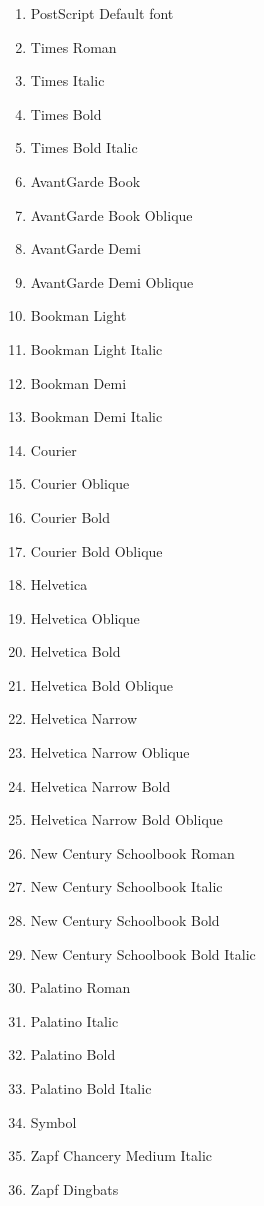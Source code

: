 \documentclass[10pt, a4paper, english]{article}%
\begin{document}
\begin{enumerate}
\item[-1] PostScript Default font
\item[0]  Times Roman
\item     Times Italic
\item     Times Bold
\item     Times Bold Italic
\item     AvantGarde Book
\item     AvantGarde Book Oblique
\item     AvantGarde Demi
\item     AvantGarde Demi Oblique
\item     Bookman Light
\item     Bookman Light Italic
\item     Bookman Demi
\item     Bookman Demi Italic
\item     Courier
\item     Courier Oblique
\item     Courier Bold
\item     Courier Bold Oblique
\item     Helvetica
\item     Helvetica Oblique
\item     Helvetica Bold
\item     Helvetica Bold Oblique
\item     Helvetica Narrow
\item     Helvetica Narrow Oblique
\item     Helvetica Narrow Bold
\item     Helvetica Narrow Bold Oblique
\item     New Century Schoolbook Roman
\item     New Century Schoolbook Italic
\item     New Century Schoolbook Bold
\item     New Century Schoolbook Bold Italic
\item     Palatino Roman
\item     Palatino Italic
\item     Palatino Bold
\item     Palatino Bold Italic
\item     Symbol
\item     Zapf Chancery Medium Italic
\item     Zapf Dingbats
\end{enumerate}
      
\end{document}
